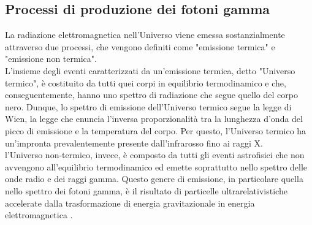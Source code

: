 \documentclass[10pt]{article}
\begin{document}
\subsection{Processi di produzione dei fotoni gamma}
La radiazione elettromagnetica nell'Universo viene emessa sostanzialmente attraverso due processi, che vengono definiti come "emissione termica" e "emissione non termica".
\\
L'insieme degli eventi caratterizzati da un'emissione termica, detto "Universo termico", è costituito da tutti quei corpi in equilibrio termodinamico e che, conseguentemente, hanno uno spettro di radiazione che segue quello del corpo nero.
Dunque, lo spettro di emissione dell'Universo termico segue la legge di Wien, la legge che enuncia l'inversa proporzionalità tra la lunghezza d'onda del picco di emissione e la temperatura del corpo. Per questo, l'Universo termico ha un'impronta prevalentemente presente dall'infrarosso fino ai raggi X.
\\

l'Universo non-termico, invece, è composto da tutti gli eventi astrofisici che non avvengono all'equilibrio termodinamico ed emette soprattutto nello spettro delle onde radio e dei raggi gamma. Questo genere di emissione, in particolare quella nello spettro dei fotoni gamma, è il risultato di particelle ultrarelativistiche accelerate dalla trasformazione di energia gravitazionale in energia elettromagnetica \cite{VHEGA}.
\\
\end{document}
